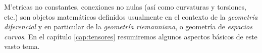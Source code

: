 M'etricas no constantes, conexiones no nulas (así como curvaturas y torsiones, etc.) son objetos matemáticos definidos usualmente en el contexto de la \textit{geometría diferencial} y en particular de la \textit{geometría riemanniana}, o geometría de \textit{espacios curvos}. En el capítulo \ref{cap:tensores} resumiremos algunos aspectos básicos de este vasto tema.

%
%
%
